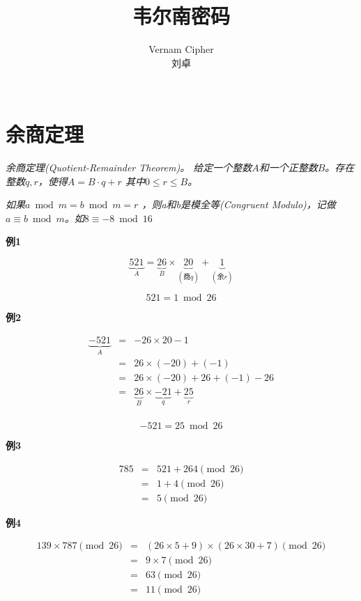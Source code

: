 \documentclass{article}
\date{}
\title{韦尔南密码}
\author{
Vernam Cipher\\
 刘卓\\
 \texttt{ } \\
}
\begin{document}
\maketitle

\section{余商定理}
\textit{余商定理(Quotient-Remainder Theorem)。 给定一个整数$A$和一个正整数$B$。存在整数$q,r$，使得$
A=B \cdot q+r$ 其中$0 \leq r \leq B$。}

\textit{如果$a \bmod m = b \bmod m = r$ ，则a和b是模全等(Congruent Modulo)，记做$a \equiv b \bmod m$。如$8 \equiv -8 \bmod 16$}



\textbf{例1}

$$ \underbrace{521}_{A}=  \underbrace{26}_{B} \times  \underbrace{20}_{(\mbox{商}q)} +\underbrace{1}_{(\mbox{余}r)}
$$

$$521 = 1 \bmod 26$$ 


\textbf{例2}

\begin{eqnarray}   
\label{eq}
\underbrace{-521}_{A}&=& -26 \times 20 -1 \nonumber \\ 
&=& 26 \times (-20) +  (-1)  \nonumber \\ 
&=& 26 \times (-20) + 26 + (-1) -26 \nonumber \\ 
&=& \underbrace{26}_{B} \times \underbrace{-21}_{q} + \underbrace{25}_{r}\nonumber \\
\nonumber 
\end{eqnarray}

$$-521 = 25 \bmod 26$$ 

\textbf{例3}

\begin{eqnarray}   
\label{eq}
785  &=& 521 + 264 \pmod{26} \nonumber \\ 
&=& 1 +4 \pmod{26} \nonumber \\ 
&=& 5 \pmod{26}
\nonumber 
\end{eqnarray} 

\clearpage


\textbf{例4}

\begin{eqnarray}   
\label{eq}
139 \times 787 \pmod{26} &=& (26 \times 5 + 9) \times   (26 \times 30 + 7) \pmod{26} \nonumber \\ 
&=& 9 \times 7 \pmod{26} \nonumber \\ 
&=& 63\pmod{26} \nonumber \\ 
&=& 11 \pmod{26}
\nonumber 
\end{eqnarray}
\end{document}
